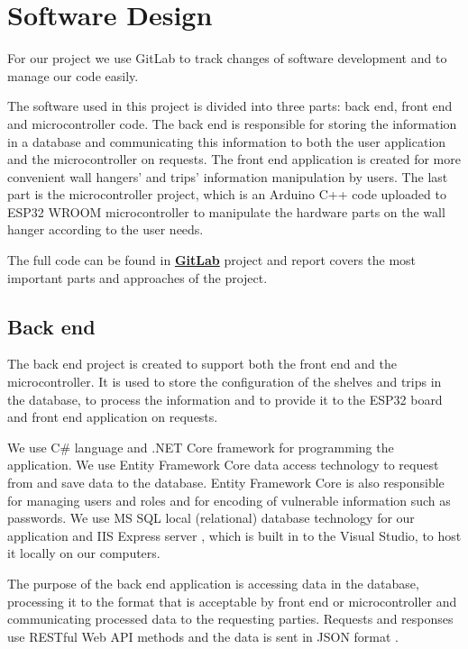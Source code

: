 \documentclass{article}
\begin{document}
\section{Software Design}
For our project we use GitLab to track changes of software development and to manage our code easily. 

The software used in this project is divided into three parts: back end, front end and microcontroller code. The back end is responsible for storing the information in a database and communicating this information to both the user application and the microcontroller on requests. The front end application is created for more convenient wall hangers' and trips' information manipulation by users. The last part is the microcontroller project, which is an Arduino C++ code uploaded to ESP32 WROOM microcontroller to manipulate the hardware parts on the wall hanger according to the user needs.

The full code can be found in \textbf{\href{https://gitlab.science.ru.nl/ndl1/21-22-project/A4}{GitLab}} project and report covers the most important parts and approaches of the project.

\subsection{Back end}
The back end project is created to support both the front end and the microcontroller. It is used to store the configuration of the shelves and trips in the database, to process the information and to provide it to the ESP32 board and front end application on requests. 

We use C\# language and .NET Core framework for programming the application. We use Entity Framework Core data access technology \cite{EFC} to request from and save data to the database. Entity Framework Core is also responsible for managing users and roles and for encoding of vulnerable information such as passwords. We use MS SQL local (relational) database technology for our application and IIS Express server \cite{iis}, which is built in to the Visual Studio, to host it locally on our computers. 

The purpose of the back end application is accessing data in the database, processing it to the format that is acceptable by front end or microcontroller and communicating processed data to the requesting parties. Requests and responses use RESTful Web API methods \cite{REST} and the data is sent in JSON format \cite{JSON}.
\end{document}

